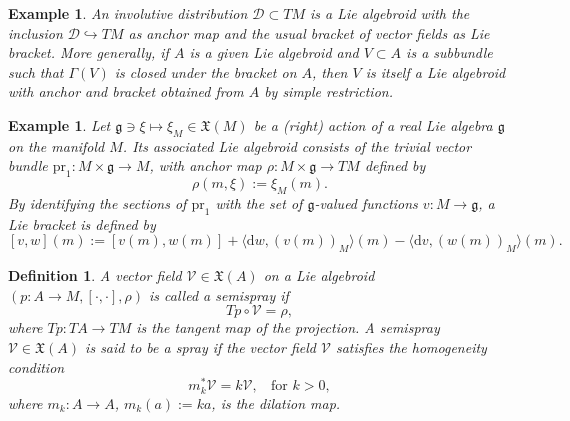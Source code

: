 \documentclass[12pt,letterpaper]{article}
\newtheorem{definition}[theorem]{Definition}
\newtheorem{example}[theorem]{Example}
\numberwithin{equation}{section}
\begin{document}
\begin{example}
An involutive distribution $\mathcal{D}\subset TM$ is a Lie algebroid with the inclusion $\mathcal{D} \hookrightarrow TM$ as anchor map and the usual bracket of vector fields as Lie bracket.
More generally, if $A$ is a given Lie algebroid and $V\subset A$ is a subbundle such that $\Gamma(V)$ is closed under the bracket on $A$, 
then $V$ is itself a Lie algebroid with anchor and bracket obtained from $A$ by simple restriction.
\end{example}

\begin{example}
Let  $\mathfrak{g}\ni \xi \mapsto \xi_M \in\mathfrak{X}(M) $ be a (right) action of a real Lie algebra $\mathfrak{g}$ on the manifold $M$. 
Its associated Lie algebroid consists of the trivial vector bundle $\mathrm{pr}_1:M \times\mathfrak{g} \rightarrow M$,
 with anchor map $\rho: M \times\mathfrak{g} \rightarrow TM $ defined by
$$\rho(m,\xi):=\xi_M(m). $$
By identifying the sections of $\mathrm{pr}_1$ with the set of $\mathfrak{g}$-valued functions $v: M \rightarrow \mathfrak{g}$, 
a Lie bracket is defined by
 $$ [v,w](m):= [ v(m),w(m)] + \langle \mathrm{d}w, (v(m))_M \rangle (m) -    \langle \mathrm{d}v, (w(m))_M \rangle (m).$$
\end{example}




 
\begin{definition}
A vector field $\mathcal{V}\in \mathfrak{X}(A)$ on a Lie algebroid  $ (p:A\rightarrow M, [ \cdot,\cdot], \rho) $ is called a \emph{semispray} if
\begin{equation}
Tp \circ \mathcal{V} = \rho, \label{defsemi}
\end{equation}
where $Tp: TA \rightarrow TM$ is the tangent map of the projection. 
A semispray  $\mathcal{V}\in \mathfrak{X}(A)$ is said to be a \emph{spray} 
if the vector field  $\mathcal{V}$ satisfies the homogeneity condition
\begin{equation}
m^*_k  \mathcal{V}  = k\mathcal{V}, \ \ \ \ \text{for }k>0,\label{homogcond}
\end{equation}
where $m_k: A \rightarrow A$, $m_k(a):= ka$, is the dilation map.
\end{definition}
\end{document}
